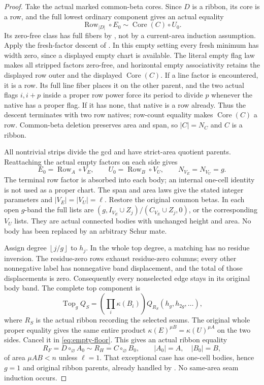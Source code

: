 \documentclass[11pt,a4paper]{amsart}
\numberwithin{equation}{section}
\theoremstyle{plain}
\theoremstyle{definition}
\newcommand{\Row}{\operatorname{Row}}
\newcommand{\Core}{\operatorname{Core}}
\newcommand{\floor}[1]{\left\lfloor#1\right\rfloor}
\begin{document}
\begin{proof}
Take the actual marked common-beta cores.  Since \(D\) is a ribbon, its core
is a row, and the full lowest ordinary component gives an actual equality
\[
 \Row_{|D|}\circ E_0\sim\Core(C)\circ U_0.
\]
Its zero-free class has full fibers by , not by a
current-area induction assumption.  Apply the fresh-factor descent of
.  In this empty setting every fresh minimum has
width zero, since a displayed empty chart is available.  The literal
empty flag law makes all stripped factors zero-free, and horizontal empty
associativity retains the displayed row outer and the displayed
\(\Core(C)\).  If a line factor is encountered, it is a row.  Its full line
fiber places it on the other parent, and the two actual flags \(i,i+p\)
inside a proper row power force its period to divide \(p\) whenever the
native has a proper flag.  If it has none, that native is a row already.
Thus the descent terminates with two row natives; row-count equality
makes \(\Core(C)\) a row.  Common-beta deletion preserves area and span,
so \(|C|=N_C\) and \(C\) is a ribbon.

All nontrivial strips divide the gcd and have strict-area quotient parents.
Reattaching the actual empty factors on each side gives
\[
 E_0=\Row_A\circ V_E,\qquad U_0=\Row_B\circ V_U,
 \qquad N_{V_E}=N_{V_U}=g.
\]
The terminal row factor is absorbed into each body; an internal one-cell
identity is not used as a proper chart.  The span and area laws give the
stated integer parameters and \(|V_E|=|V_U|=\ell\).
Restore the original common betas.  In each open \(g\)-band the full lists
are \((g,I_{V_E}\cup Z_j)/(C_{V_E}\cup Z_j,0)\), or the corresponding
\(V_U\) lists.  They are actual connected bodies with unchanged height and
area.  No body has been replaced by an arbitrary Schur mate.

Assign degree \(\floor{j/g}\) to \(h_j\).  In the whole top degree, a matching
has no residue inversion.  The residue-zero rows exhaust residue-zero
columns; every other nonnegative label has nonnegative band displacement,
and the total of those displacements is zero.  Consequently every
nonselected edge stays in its original body band.  The complete top
component is
\begin{equation}\label{eq:empty-floor}
 \operatorname{Top}_g Q_S
   =\left(\prod_i\kappa(B_i)\right)
           Q_{R_S}(h_g,h_{2g},\ldots),
\end{equation}
where \(R_S\) is the actual ribbon recording the selected seams.
The original whole proper equality gives the same entire product
\(\kappa(E)^{\mu B}=\kappa(U)^{\mu A}\) on the two sides.
Cancel it in \eqref{eq:empty-floor}.  This gives an actual ribbon equality
\[
 R_F=D\circ_\varnothing A_0\sim
 R_H=C\circ_\varnothing B_0,
 \qquad |A_0|=A,\quad |B_0|=B,
\]
of area \(\mu AB<n\) unless \(\ell=1\).  That exceptional case has one-cell
bodies, hence \(g=1\) and original ribbon parents, already handled by
.
No same-area seam induction occurs.


\end{proof}
\end{document}
